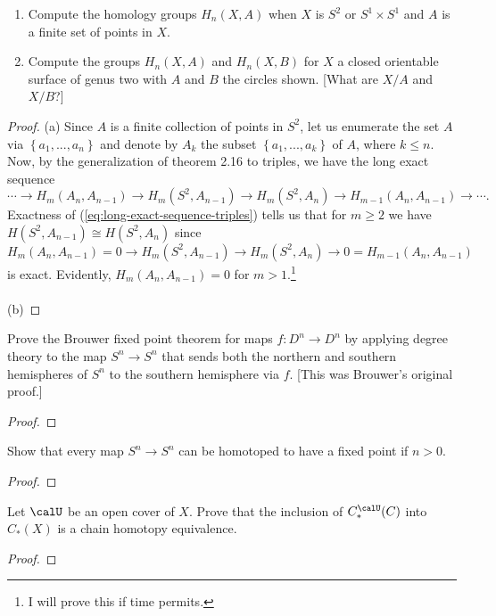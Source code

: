 \begin{problem}[Hatcher {\S}2.1, Ex.\,17]
\begin{enumerate}[label=(\alph*)]
\item Compute the homology groups $H_n(X,A)$ when $X$ is $S^2$ or
  $S^1\times S^1$ and $A$ is a finite set of points in $X$.
\item Compute the groups $H_n(X,A)$ and $H_n(X,B)$ for $X$ a closed
  orientable surface of genus two with $A$ and $B$ the circles shown. [What
  are $X/A$ and $X/B$?]
\end{enumerate}
\end{problem}
\begin{proof}
(a) Since $A$ is a finite collection of points in $S^2$, let us enumerate
the set $A$ via $\left\{ a_1,...,a_n \right\}$ and denote by $A_k$ the
subset $\left\{a_1,...,a_k\right\}$ of $A$, where $k\leq n$. Now, by the
generalization of theorem 2.16 to triples, we have the long exact sequence
\begin{equation}
\label{eq:long-exact-sequence-triples}
\cdots\longrightarrow H_m(A_n,A_{n-1})\longrightarrow
H_m(S^2,A_{n-1})\longrightarrow H_m(S^2,A_n)
\longrightarrow H_{m-1}(A_n,A_{n-1})\longrightarrow\cdots.
\end{equation}
Exactness of (\ref{eq:long-exact-sequence-triples}) tells us that for
$m\geq 2$ we have $H(S^2,A_{n-1})\cong H(S^2,A_n)$ since
\[
H_m(A_n,A_{n-1})=0\longrightarrow H_m(S^2,A_{n-1})\longrightarrow
H_m(S^2,A_n)\longrightarrow 0=H_{m-1}(A_n,A_{n-1})
\]
is exact. Evidently, $H_m(A_n,A_{n-1})=0$ for $m>1$.\footnote{I will prove
  this if time permits.}
\\\\
(b)
\end{proof}
\newpage

\begin{problem}[Hatcher {\S}2.2, 1]
  Prove the Brouwer fixed point theorem for maps $f\colon D^n\to D^n$ by applying
  degree theory to the map $S^n\to S^n$ that sends both the northern and
  southern hemispheres of $S^n$ to the southern hemisphere via $f$. [This was
  Brouwer’s original proof.]
\end{problem}
\begin{proof}
\end{proof}
\newpage

\begin{problem}[Hatcher {\S}2.2, 6]
  Show that every map $S^n\to S^n$ can be homotoped to have a fixed point
  if $n>0$.
\end{problem}
\begin{proof}
\end{proof}
\newpage

\begin{problem}
Let $\calU$ be an open cover of $X$. Prove that the inclusion of
$C_*^{\calU}(C)$ into $C_*(X)$ is a chain homotopy equivalence.
\end{problem}
\begin{proof}
\end{proof}

